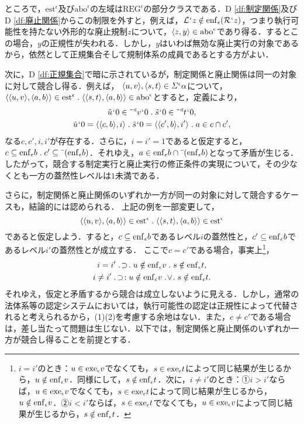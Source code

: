 ところで，$ \mathrm{est}^\epsilon $及び$ \mathrm{abo}^\epsilon $の左域は$ \mathrm{REG}^\epsilon $の部分クラスである．D \ref{df:制定関係}及びD \ref{df:廃止関係}からこの制限を外すと，例えば，$\mathcal{L}{\mspace{1mu}{`}\mspace{1mu}} z\notin \mathrm{enf}_{\epsilon}(\mathcal{R}{\mspace{1mu}{`}\mspace{1mu}} z)$，つまり執行可能性を持たない外形的な廃止規制$z$について，$\langle z,y \rangle\in\mathrm{abo}^\epsilon$であり得る．するとこの場合，$y$の正規性が失われる．しかし，$y$はいわば無効な廃止実行の対象であるから，依然として正規集合そして規制体系の成員であるとする方がよい．

次に，D \ref{df:正規集合}で暗に示されているが，制定関係と廃止関係は同一の対象に対して競合し得る．例えば，
$ \langle u,v \rangle,\langle s,t \rangle\in\varSigma^{\epsilon}\alpha $について，$ \orp{\orp{u,v},\orp{a,b}}\in\mathrm{est}^\epsilon\con{1}\orp{\orp{s,t},\orp{a,b}}\in \mathrm{abo}^\epsilon $とすると，定義により，
\begin{gather*}
    \tilde{u}\fap 0\in \tildel{\trgl{v}}\fap 0\con{1}\tilde{s}\fap 0\in \tildel{\trgl{t}}\fap 0,\\
    \tilde{u}\fap 0 = \orp{\orp{c,b},i}\con{1}\tilde{s}\fap 0 = \orp{\orp{c',b},i'}\con{1}a\in c\cap c',
\end{gather*}
なる$c,c',i,i'$が存在する．さらに，$i = i' = 1$であると仮定すると，$c\subseteq\enf{\epsilon}b\con{1}c'\subseteq\barl{(\enf{\epsilon}b)}$．それゆえ，$a\in\mathrm{enf}_{\epsilon}b\cap\bar{\:\:}(\mathrm{enf}_{\epsilon}b) $となって矛盾が生じる．したがって，競合する制定実行と廃止実行の修正条件の実現について，その少なくとも一方の蓋然性レベルは$1$未満である．

さらに，制定関係と廃止関係のいずれか一方が同一の対象に対して競合するケースも，結論的には認められる．
上記の例を一部変更して，
\[
    \orp{\orp{u,v},\orp{a,b}}\in\mathrm{est}^\epsilon\con{1}\orp{\orp{s,t},\orp{a,b}}\in \mathrm{est}^\epsilon
\]
であると仮定しよう．すると，$c\subseteq\mathrm{enf}_{\epsilon}b$であるレベル$i$の蓋然性と，$c'\subseteq\mathrm{enf}_{\epsilon}b$であるレベル$i'$の蓋然性とが成立する．
ここで$c = c'$である場合，事実上\footnote{
    $i = i'$のとき：$u\in\mathrm{exe}_{\epsilon}v$でなくても，$s\in\mathrm{exe}_{\epsilon}t$によって同じ結果が生じるから，$u\notin\mathrm{enf}_{\epsilon}v$．同様にして，$s\notin\mathrm{enf}_{\epsilon}t$．次に，$i \neq i'$のとき：①$i>i'$ならば，$u\in\mathrm{exe}_{\epsilon}v$でなくても，$s\in\mathrm{exe}_{\epsilon}t$によって同じ結果が生じるから，$u\notin\mathrm{enf}_{\epsilon}v$．②$i<i'$ならば，$s\in\mathrm{exe}_{\epsilon}t$でなくても，$u\in\mathrm{exe}_{\epsilon}v$によって同じ結果が生じるから，$s\notin\mathrm{enf}_{\epsilon}t$．
}，
\setcounter{equation}{0}
\begin{gather}
    i = i' \case{1}{1}{1}u\notin\enf{\epsilon}v\con{1}s\notin\enf{\epsilon}t,\\
    i\neq i'\case{1}{1}{2}u\notin\enf{\epsilon}v\case{2}{1}{1}s\notin\enf{\epsilon}t.
\end{gather}
それゆえ，仮定と矛盾するから競合は成立しないように見える．しかし，通常の法体系等の認定システムにおいては，執行可能性の認定は正規性によって代替されると考えられるから，(1)(2)を考慮する余地はない．また，$c\neq c'$である場合は，差し当たって問題は生じない．以下では，制定関係と廃止関係のいずれか一方が競合し得ることを前提とする．

